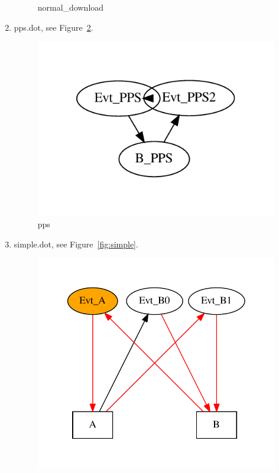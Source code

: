 \documentclass[12pt,a4paper]{report}
\begin{document}
\begin{enumerate}
\begin{figure}
        \caption{normal\_download}
        \label{fig:normal_download}
    \end{figure}
\item pps.dot, see Figure~\ref{fig:pps}.
    \begin{figure}
        \centering 
        \includegraphics*[width=1.0\textwidth,keepaspectratio]{TestPattern/pps.pdf}
        \caption{pps}
        \label{fig:pps}
    \end{figure}
\item simple.dot, see Figure~\ref{fig:simple}.
    \begin{figure}
        \centering 
        \includegraphics*[width=1.0\textwidth,keepaspectratio]{TestPattern/simple.pdf}

\end{figure}
\end{enumerate}
\end{document}
